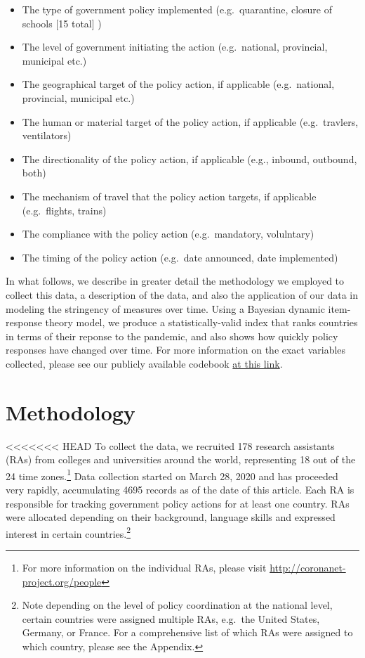 \documentclass[]{article}
\providecommand{\tightlist}{%
  \setlength{\itemsep}{0pt}\setlength{\parskip}{0pt}}
\let\rmarkdownfootnote\footnote%
\def\footnote{\protect\rmarkdownfootnote}
\begin{document}
\begin{itemize}
\tightlist
\item
  The type of government policy implemented (e.g.~quarantine, closure of schools {[}15 total{]} )
\item
  The level of government initiating the action (e.g.~national, provincial, municipal etc.)
\item
  The geographical target of the policy action, if applicable (e.g.~national, provincial, municipal etc.)
\item
  The human or material target of the policy action, if applicable (e.g.~travlers, ventilators)
\item
  The directionality of the policy action, if applicable (e.g., inbound, outbound, both)
\item
  The mechanism of travel that the policy action targets, if applicable (e.g.~flights, trains)
\item
  The compliance with the policy action (e.g.~mandatory, volulntary)
\item
  The timing of the policy action (e.g.~date announced, date implemented)
\end{itemize}

In what follows, we describe in greater detail the methodology we employed to collect this data, a description of the data, and also the application of our data in modeling the stringency of measures over time. Using a Bayesian dynamic item-response theory model, we produce a statistically-valid index that ranks countries in terms of their reponse to the pandemic, and also shows how quickly policy responses have changed over time. For more information on the exact variables collected, please see our publicly available codebook \href{https://docs.google.com/document/d/1zvNMpwj0onFvUZ_gLl4RRjqS-clbHv3TIX6EOHofsME/edit?usp=sharing}{at this link}.

\hypertarget{methodology}{%
\section{Methodology}\label{methodology}}

<<<<<<< HEAD
To collect the data, we recruited 178 research assistants (RAs) from colleges and universities around the world, representing 18 out of the 24 time zones.\footnote{For more information on the individual RAs, please visit \url{http://coronanet-project.org/people}} Data collection started on March 28, 2020 and has proceeded very rapidly, accumulating 4695 records as of the date of this article. Each RA is responsible for tracking government policy actions for at least one country. RAs were allocated depending on their background, language skills and expressed interest in certain countries.\footnote{Note depending on the level of policy coordination at the national level, certain countries were assigned multiple RAs, e.g.~the United States, Germany, or France. For a comprehensive list of which RAs were assigned to which country, please see the Appendix.}
\end{document}
